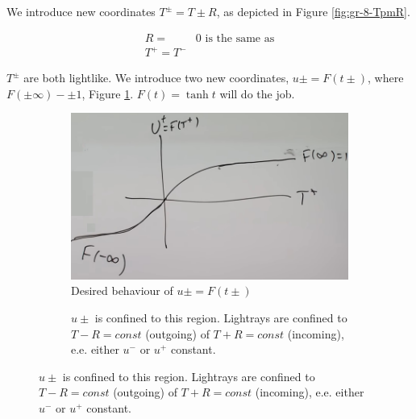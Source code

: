 \documentclass[]{article}
\begin{document}
{We introduce new coordinates $T^\pm=T\pm R$, as depicted in Figure \ref{fig:gr-8-TpmR}.

\begin{align*}
	R=& 0\text{ is the same as}\\
	T^+ = T^-
\end{align*}

$T^\pm$ are both lightlike. We introduce two new coordinates, $u\pm = F(t\pm)$, where $F(\pm \infty)-\pm 1$, Figure \ref{fig:gr-8-F}. $F(t)= \tanh t$ will do the job.

\begin{figure}[H]
	\begin{center}
		\caption{Penrose-Carter coordinates}
		\begin{subfigure}[t]{0.3\textwidth}
			\caption{Desired behaviour of $u\pm = F(t\pm)$}\label{fig:gr-8-F}
			\includegraphics[width=\textwidth]{gr-8-F}
		\end{subfigure}
		\;
		\begin{subfigure}[t]{0.3\textwidth}
			\caption{$u\pm$ is confined to this region. Lightrays are confined to $T-R=const$ (outgoing) of $T+R=const$ (incoming), e.e. either $u^-$ or $u^+$ constant.}\label{fig:gr-8-uPM}

\end{subfigure}
\end{center}
\end{figure}}
\end{document}
